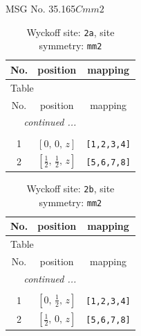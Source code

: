 \documentclass[fleqn,8pt]{jsarticle}
\begin{document}
\setcounter{MaxMatrixCols}{32}

\renewcommand{\tablename}{Table~}
\renewcommand{\figurename}{Figure~}
\begin{center}
\LARGE
MSG No. 35.165\quad$Cmm2$
\end{center}
\renewcommand{\arraystretch}{1.2}
\begin{longtable}{ccc}
\caption{Wyckoff site: {\tt 2a}, site symmetry: {\tt mm2}}
 \\
 \hline \hline
No. & position & mapping \\ \hline \endfirsthead

\multicolumn{2}{l}{\tablename\ \thetable{}} \\
 \hline \hline
No. & position & mapping \\ \hline \endhead

 \hline \hline
\multicolumn{2}{r}{\footnotesize\it continued ...} \\ \endfoot

 \hline \hline
\multicolumn{2}{r}{} \\ \endlastfoot

1 & $\left[ 0,\, 0,\, z \right]$ & {\tt [1,2,3,4]} \\ \hline
2 & $\left[ \frac{1}{2},\, \frac{1}{2},\, z \right]$ & {\tt [5,6,7,8]} \\
\end{longtable}
\renewcommand{\arraystretch}{1.2}
\begin{longtable}{ccc}
\caption{Wyckoff site: {\tt 2b}, site symmetry: {\tt mm2}}
 \\
 \hline \hline
No. & position & mapping \\ \hline \endfirsthead

\multicolumn{2}{l}{\tablename\ \thetable{}} \\
 \hline \hline
No. & position & mapping \\ \hline \endhead

 \hline \hline
\multicolumn{2}{r}{\footnotesize\it continued ...} \\ \endfoot

 \hline \hline
\multicolumn{2}{r}{} \\ \endlastfoot

1 & $\left[ 0,\, \frac{1}{2},\, z \right]$ & {\tt [1,2,3,4]} \\ \hline
2 & $\left[ \frac{1}{2},\, 0,\, z \right]$ & {\tt [5,6,7,8]} \\
\end{longtable}
\renewcommand{\arraystretch}{1.2}
\end{document}

